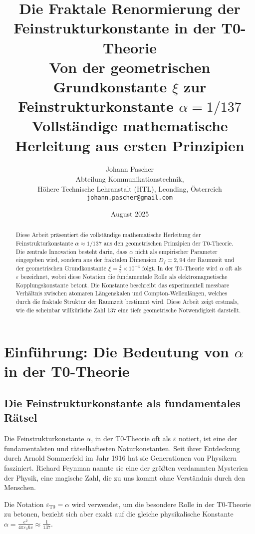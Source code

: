 \documentclass[12pt,a4paper]{article}
\title{\textbf{Die Fraktale Renormierung der Feinstrukturkonstante in der T0-Theorie}\\[0.5cm]
	\large Von der geometrischen Grundkonstante $\xi$ zur Feinstrukturkonstante $\alpha = 1/137$\\[0.3cm]
	\normalsize Vollständige mathematische Herleitung aus ersten Prinzipien}
\author{Johann Pascher\\
	\small Abteilung Kommunikationstechnik,\\
	\small Höhere Technische Lehranstalt (HTL), Leonding, Österreich\\
	\small \texttt{johann.pascher@gmail.com}}
\date{August 2025}
\theoremstyle{definition}
\begin{document}
	
	\maketitle
	
	\begin{abstract}
		Diese Arbeit präsentiert die vollständige mathematische Herleitung der Feinstrukturkonstante $\alpha \approx 1/137$ aus den geometrischen Prinzipien der T0-Theorie. Die zentrale Innovation besteht darin, dass $\alpha$ nicht als empirischer Parameter eingegeben wird, sondern aus der fraktalen Dimension $D_f = 2{,}94$ der Raumzeit und der geometrischen Grundkonstante $\xi = \frac{4}{3} \times 10^{-4}$ folgt. In der T0-Theorie wird $\alpha$ oft als $\varepsilon$ bezeichnet, wobei diese Notation die fundamentale Rolle als elektromagnetische Kopplungskonstante betont. Die Konstante beschreibt das experimentell messbare Verhältnis zwischen atomaren Längenskalen und Compton-Wellenlängen, welches durch die fraktale Struktur der Raumzeit bestimmt wird. Diese Arbeit zeigt erstmals, wie die scheinbar willkürliche Zahl 137 eine tiefe geometrische Notwendigkeit darstellt.
	\end{abstract}
	
	\tableofcontents
	\newpage
	
	\section{Einführung: Die Bedeutung von $\alpha$ in der T0-Theorie}
	
	\subsection{Die Feinstrukturkonstante als fundamentales Rätsel}
	
	Die Feinstrukturkonstante $\alpha$, in der T0-Theorie oft als $\varepsilon$ notiert, ist eine der fundamentalsten und rätselhaftesten Naturkonstanten. Seit ihrer Entdeckung durch Arnold Sommerfeld im Jahr 1916 hat sie Generationen von Physikern fasziniert. Richard Feynman nannte sie eine der größten verdammten Mysterien der Physik, eine magische Zahl, die zu uns kommt ohne Verständnis durch den Menschen.
	
	Die Notation $\varepsilon_{\mathrm{T0}} = \alpha$ wird verwendet, um die besondere Rolle in der T0-Theorie zu betonen, bezieht sich aber exakt auf die gleiche physikalische Konstante $\alpha = \frac{e^2}{4\pi\varepsilon_0\hbar c} \approx \frac{1}{137}$.
	
\end{document}
